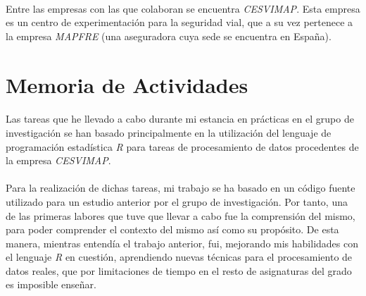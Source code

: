\documentclass[11pt,a4paper,spanish]{article}
\begin{document}
    \paragraph{}
    Entre las empresas con las que colaboran se encuentra \emph{CESVIMAP}. Esta empresa es un centro de experimentación para la seguridad vial, que a su vez pertenece a la empresa \emph{MAPFRE} (una aseguradora cuya sede se encuentra en España).

    \paragraph{}


  \section{Memoria de Actividades}

    \paragraph{}
    Las tareas que he llevado a cabo durante mi estancia en prácticas en el grupo de investigación se han basado principalmente en la utilización del lenguaje de programación estadística \emph{R} para tareas de procesamiento de datos procedentes de la empresa \emph{CESVIMAP}.

    \paragraph{}
    Para la realización de dichas tareas, mi trabajo se ha basado en un código fuente utilizado para un estudio anterior por el grupo de investigación. Por tanto, una de las primeras labores que tuve que llevar a cabo fue la comprensión del mismo, para poder comprender el contexto del mismo así como su propósito. De esta manera, mientras entendía el trabajo anterior, fui, mejorando mis habilidades con el lenguaje \emph{R} en cuestión, aprendiendo nuevas técnicas para el procesamiento de datos reales, que por limitaciones de tiempo en el resto de asignaturas del grado es imposible enseñar.
\end{document}
